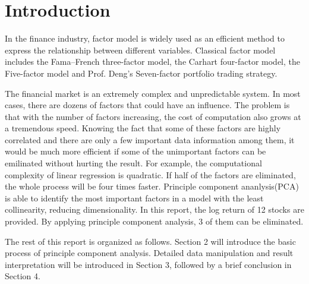 \documentclass[conference]{IEEEtran}
\begin{document}


%
\IEEEpeerreviewmaketitle



\section{Introduction}
In the finance industry, factor model is widely used as an efficient method to express the relationship between different variables.  Classical factor model includes the Fama–French three-factor model\cite{ThreeFactor}, the Carhart four-factor model\cite{FourFactor}, the Five-factor model\cite{FiveFactor} and Prof. Deng's Seven-factor portfolio trading strategy\cite{SevenFactor}. 

The financial market is an extremely complex and unpredictable system. In most cases, there are dozens of factors that could have an influence. The problem is that with the number of factors increasing, the cost of computation also grows at a tremendous speed. Knowing the fact that some of these factors are highly correlated and there are only a few important data information among them, it would be much more efficient if some of the unimportant factors can be emilinated without hurting the result. For example, the computational complexity of linear regression is quadratic. If half of the factors are eliminated, the whole process will be four times faster. Principle component ananlysis(PCA) is able to identify the most important factors in a model with the least collinearity, reducing dimensionality. In this report, the log return of 12 stocks are provided. By applying principle component analysis, 3 of them can be eliminated. 

The rest of this report is organized as follows. Section 2 will introduce the basic process of principle component analysis. Detailed data manipulation and result interpretation will be introduced in Section 3, followed by a brief conclusion in Section 4.
\end{document}
